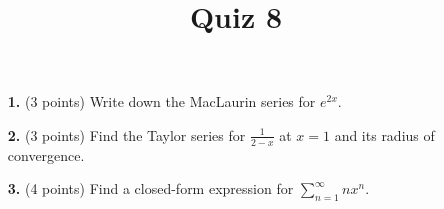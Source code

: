 \documentclass[12pt]{amsart}
\title{Quiz 8}
\begin{document}
\maketitle
\thispagestyle{fancy}

\vskip0.25in
\begin{enumerate}


\item[\textbf{1. }] (3 points) Write down the MacLaurin series for $e^{2x}$.

\vskip 2in

\item[\textbf{2. }](3 points) Find the Taylor series for $\displaystyle \frac{1}{2-x}$ at $x = 1$ and its radius of convergence.
 
\vskip 2in

\item[\textbf{3. }] (4 points) Find a closed-form expression for $\sum_{n=1}^\infty n x^n$.


\end{enumerate}
\end{document}
